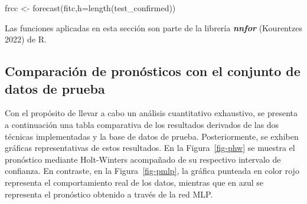\documentclass[
  letterpaper,
  DIV=11,
  numbers=noendperiod]{scrreport}
\newenvironment{Shaded}{\begin{snugshade}}{\end{snugshade}}
\newcommand{\AttributeTok}[1]{\textcolor[rgb]{0.40,0.45,0.13}{#1}}
\newcommand{\FunctionTok}[1]{\textcolor[rgb]{0.28,0.35,0.67}{#1}}
\newcommand{\NormalTok}[1]{\textcolor[rgb]{0.00,0.23,0.31}{#1}}
\newcommand{\OtherTok}[1]{\textcolor[rgb]{0.00,0.23,0.31}{#1}}
\theoremstyle{plain}
\theoremstyle{definition}
\theoremstyle{definition}
\theoremstyle{plain}
\theoremstyle{remark}
\begin{document}
\begin{Shaded}
\begin{Highlighting}[]
\NormalTok{frcc }\OtherTok{\textless{}{-}} \FunctionTok{forecast}\NormalTok{(fitc,}\AttributeTok{h=}\FunctionTok{length}\NormalTok{(test\_confirmed))}
\end{Highlighting}
\end{Shaded}

\begin{tcolorbox}[enhanced jigsaw, titlerule=0mm, left=2mm, opacityback=0, toprule=.15mm, colframe=quarto-callout-note-color-frame, bottomrule=.15mm, breakable, coltitle=black, opacitybacktitle=0.6, bottomtitle=1mm, colback=white, arc=.35mm, leftrule=.75mm, toptitle=1mm, colbacktitle=quarto-callout-note-color!10!white, title=\textcolor{quarto-callout-note-color}{\faInfo}\hspace{0.5em}{Nota}, rightrule=.15mm]

Las funciones aplicadas en esta sección son parte de la librería
\textbf{\emph{nnfor}} (Kourentzes 2022) de R.

\end{tcolorbox}

\subsection{Comparación de pronósticos con el conjunto de datos de
prueba}\label{comparaciuxf3n-de-pronuxf3sticos-con-el-conjunto-de-datos-de-prueba}

Con el propósito de llevar a cabo un análisis cuantitativo exhaustivo,
se presenta a continuación una tabla comparativa de los resultados
derivados de las dos técnicas implementadas y la base de datos de
prueba. Posteriormente, se exhiben gráficas representativas de estos
resultados. En la Figura~\ref{fig-phw} se muestra el pronóstico mediante
Holt-Winters acompañado de su respectivo intervalo de confianza. En
contraste, en la Figura~\ref{fig-pmlp}, la gráfica punteada en color
rojo representa el comportamiento real de los datos, mientras que en
azul se representa el pronóstico obtenido a través de la red MLP.
\end{document}
